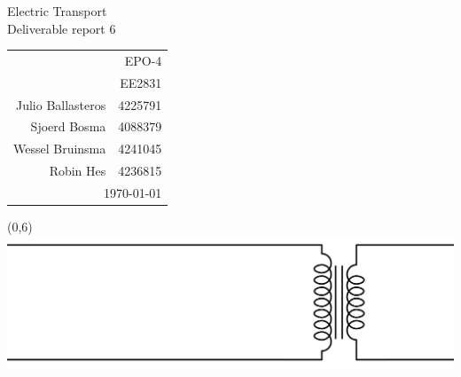 \documentclass[11pt,titlepage]{report}
\begin{document}
\begin{titlepage}

 \BgThispage

\newlength{\drop}

\begingroup
	\sffamily

	\textheight
	\vspace*{\drop}
	\begin{flushright}
		{\fontsize{1.8cm}{1em} \selectfont \color{white} Electric Transport} \\
		\vspace*{52pt}
		{\fontsize{0.8cm}{1em} \selectfont Deliverable report 6}

		\vfill

		{\fontsize{0.5cm}{1em} \selectfont
			\normalfont
			
			\begin{tabular}{rr}
				\multicolumn{2}{r}{EPO-4} \\[0.5em]
				\multicolumn{2}{r}{EE2831} \\[1.5em]
				Julio Ballasteros & 4225791\\[0.5em]
				Sjoerd Bosma & 4088379 \\[0.5em]
				Wessel Bruinsma & 4241045 \\[0.5em]
				Robin Hes & 4236815 \\[1.5em]
				\multicolumn{2}{r}{\today} \\
			\end{tabular}
			
		}
	\end{flushright}
\endgroup

\begin{textblock}{16.1}(0,6)
	\includegraphics[width=\linewidth]{resource/title.png}
\end{textblock}

\end{titlepage}
\end{document}
